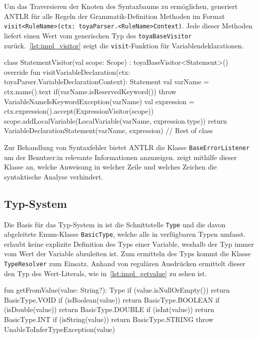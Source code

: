 Um das Traversieren der Knoten des Syntaxbaums zu ermöglichen, generiert ANTLR für alle Regeln der Grammatik-Definition Methoden im Format \texttt{visit<RuleName>(ctx: toyaParser.<RuleName>Context)}. Jede dieser Methoden liefert einen Wert vom generischen Typ des \texttt{toyaBaseVisitor} zurück.~\autoref{lst:impl_visitor} zeigt die \texttt{visit}-Funktion für Variablendeklarationen.

\begin{KotlinCode}[numbers=none, caption={\visitor-Funktion zum Erstellen eines \texttt{VariableDeclarationStatement}}, label=lst:impl_visitor]
class StatementVisitor(val scope: Scope) : toyaBaseVisitor<Statement>() {
    override fun visitVariableDeclaration(ctx: toyaParser.VariableDeclarationContext): Statement {
        val varName = ctx.name().text
        if(varName.isReservedKeyword()) throw VariableNameIsKeywordException(varName)
        val expression = ctx.expression().accept(ExpressionVisitor(scope))
        scope.addLocalVariable(LocalVariable(varName, expression.type))
        return VariableDeclarationStatement(varName, expression)
    }
    // Rest of class
}
\end{KotlinCode}

Zur Behandlung von Syntaxfehler bietet ANTLR die Klasse \texttt{BaseErrorListener} um der Benutzer:in relevante Informationen anzuzeigen. \Toya zeigt mithilfe dieser Klasse an, welche Anweisung in welcher Zeile und welches Zeichen die syntaktische Analyse verhindert.

\subsection{Typ-System}

Die Basis für das Typ-System in \toya ist die Schnittstelle \texttt{Type} und die davon abgeleitete Enum-Klasse \texttt{BasicType}, welche alle in \toya verfügbaren Typen umfasst. \Toya erlaubt keine explizite Definition des Typs einer Variable, weshalb der Typ immer vom Wert der Variable abzuleiten ist. Zum ermitteln des Typs kommt die Klasse \texttt{TypeResolver} zum Einsatz. Anhand von regulären Ausdrücken ermittelt dieser den Typ des Wert-Literals, wie in~\autoref{lst:impl_getvalue} zu sehen ist.

\begin{KotlinCode}[numbers=none, caption={Methode zur Ermittlung des Typs bei Wert-Literalen}, label={lst:getFromValue}, label=lst:impl_getvalue]
fun getFromValue(value: String?): Type {
    if (value.isNullOrEmpty()) return BasicType.VOID
    if (isBoolean(value)) return BasicType.BOOLEAN
    if (isDouble(value)) return BasicType.DOUBLE
    if (isInt(value)) return BasicType.INT
    if (isString(value)) return BasicType.STRING
    throw UnableToInferTypeException(value)
}
\end{KotlinCode}

